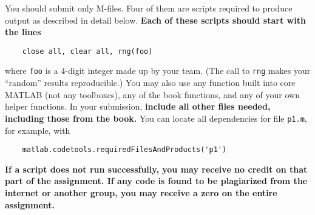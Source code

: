 \documentclass[11pt,letterpaper]{article}
\begin{document}
You should submit only M-files. Four of them are scripts required to produce output as described in detail below.
 \textbf{Each of these scripts should start with the lines}
\begin{verbatim}
    close all, clear all, rng(foo)
\end{verbatim}
where \texttt{foo} is a 4-digit integer made up by your team. (The call to \texttt{rng} makes your ``random'' results reproducible.)  
You may also use any function built into core MATLAB (not any toolboxes), any of the book functions, and any of your own helper functions. In your submission, \textbf{include all other files needed, including those from the book.} You can locate all dependencies for file \texttt{p1.m}, for example, with
\begin{verbatim}
    matlab.codetools.requiredFilesAndProducts('p1')
\end{verbatim}
\textbf{If a script does not run successfully, you may receive no credit on that part of the assignment. If any code is found to be plagiarized from the internet or another group, you may receive a zero on the entire assignment.}
\end{document}
